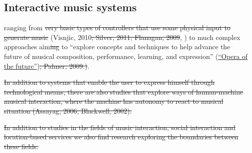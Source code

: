 \subsection{Interactive music systems}


 ranging from  \st{very basic types of controllers that use some physical input to generate music} (Visnjic, 2010\st{; Silver, 2011; Flanagan, 2009}, \href{http://createdigitalmusic.com/2012/10/at-musicmakers-experiencing-music-through-design-as-community-of-doers-collaborates-listen-watch/}{}) to much complex approaches  aim\st{ing} to ``explore concepts and techniques to help advance the future of musical composition, performance, learning, and expression'' (\href{http://www.media.mit.edu/research/groups/opera-future}{``Opera of the future''})\st{; Palmer, 2009.)}.


\st{In addition to systems that enable the user to express himself through technological means, there are also studies that explore ways of human-machine musical interaction, where the machine has autonomy to react to musical situation (Assayag, 2006; Blackwell, 2002).}

\st{In addition to studies in the fields of music interaction, social interaction and location-based services we also find research exploring the boundaries between these fields.}


